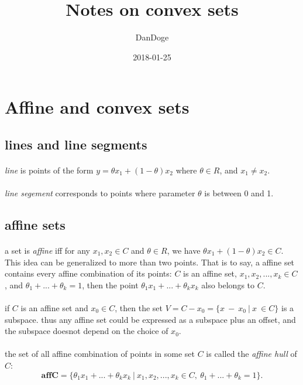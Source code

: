 \documentclass{article}
\title{Notes on convex sets}
\date{2018-01-25}
\author{DanDoge}
\begin{document}
\section{Affine and convex sets}
  \subsection{lines and line segments}
    \paragraph{} \textit{line} is points of the form $y = \theta x_1 + (1 - \theta) x_2$ where $\theta \in R$, and $x_1 \neq x_2$.
    \paragraph{} \textit{line segement} corresponds to points where parameter $\theta$ is between 0 and 1.
  \subsection{affine sets}
    \paragraph{} a set is \textit{affine} iff for any $x_1, x_2 \in C$ and $\theta \in R$, we have $\theta x_1 + (1 - \theta) x_2 \in C$. This idea can be generalized to more than two points. That is to say, a affine set contains every affine combination of its points: $C$ is an affine set, $x_1, x_2,...,x_k \in C$, and $\theta_1 +...+ \theta_k = 1$, then the point $\theta_1 x_1 + ... + \theta_k x_k$ also belongs to $C$.
    \paragraph{} if $C$ is an affine set and $x_0 \in C$, then the set $V = C - x_0 = \{x\ -\ x_0\ |\ x\ \in C \}$ is a subspace. thus any affine set could be expressed as a subspace plus an offset, and the subspace doesnot depend on the choice of $x_0$.
    \paragraph{} the set of all affine combination of points in some set $C$ is called the \textit{affine hull} of $C$:
    \begin{equation}
      \mathbf{affC} = \{\theta_1 x_1 + ... + \theta_k x_k\ |\  x_1, x_2,...,x_k \in C,\ \theta_1 +...+ \theta_k = 1\}.
    \end{equation}
\end{document}
